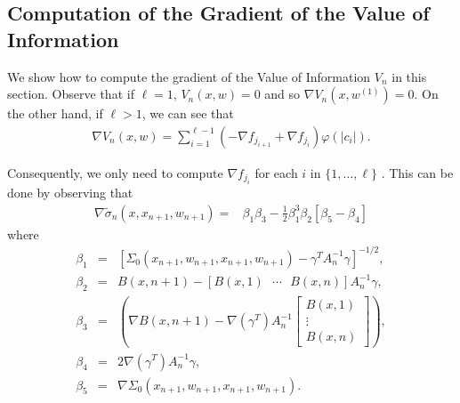 \documentclass{article}
\newcommand{\w}{w}
\begin{document}
\subsection{Computation of the Gradient of the Value of Information} 

We show how to compute the gradient of the Value of Information $V_n$ in this section. Observe that if $\ell=1$, $V_{n}\left(x,\w\right)=0$
and so $\nabla V_{n}\left(x,\w^{\left(1\right)}\right)=0$. On
the other hand, if $\ell>1$, we can see that
\begin{align*}
\nabla V_{n}\left(x,\w\right) = \sum_{i=1}^{\ell-1}\left(-\nabla f_{j_{i+1}}+\nabla f_{j_{i}}\right)\varphi\left(\left|c_{i}\right|\right).
\end{align*}

Consequently, we only need to compute $\nabla f_{j_{i}}$ for each $i$ in $\{1,\ldots,\ell\}$ . This can be done by observing that
\begin{align*}
\nabla\tilde{\sigma}_{n}\left(x,x_{n+1},\w_{n+1}\right) =&
\beta_{1} \beta_{3}-\frac{1}{2}\beta_{1}^{3}\beta_{2}\left[\beta_{5}-\beta_{4}\right] 
\end{align*}
where 
\begin{eqnarray*}
\beta_{1} & = & \left[\Sigma_{0}\left(x_{n+1},\w_{n+1},x_{n+1},\w_{n+1}\right)-\gamma^{T}A_{n}^{-1}\gamma\right]^{-1/2},\\
\beta_{2} & = & B\left(x,n+1\right)-\left[B\left(x,1\right)\mbox{ }\cdots\mbox{ }B\left(x,n\right)\right]A_{n}^{-1}\gamma,\\
\beta_{3} & = & \left(\nabla B\left(x,n+1\right)-\nabla\left(\gamma^{T}\right)A_{n}^{-1}\left[\begin{array}{c} B\left(x,1\right)\\
				\vdots\\
				B\left(x,n\right)\end{array}\right]\right),\\
\beta_{4} & = & 2\nabla\left(\gamma^{T}\right)A_{n}^{-1}\gamma,\\
\beta_{5} & = & \nabla\Sigma_{0}\left(x_{n+1},\w_{n+1},x_{n+1},\w_{n+1}\right).
\end{eqnarray*}
\end{document}
